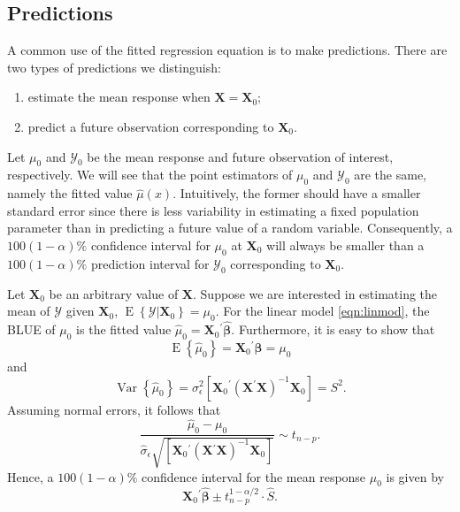 \documentclass[cmfont,usenames,dvipsnames,leqno]{afit-etd}\usepackage[]{graphicx}\usepackage[]{color}
\newcommand{\trans}{\ensuremath{^\prime}}
\newcommand{\mc}[1]{\ensuremath{\mathcal{#1}}}
\newcommand{\wh}[1]{\ensuremath{\widehat{#1}}}
\newcommand{\E}{\operatorname{E}}
\newcommand{\var}{\operatorname{Var}}
\newcommand{\X}{\ensuremath{\bm{X}}}
\begin{document}
\subsection{Predictions}
A common use of the fitted regression equation is to make predictions. There are two types of predictions we distinguish:
\begin{enumerate}[(1)]
  \item estimate the mean response when $\X = \X_0$;
  \item predict a future observation corresponding to $\X_0$.
\end{enumerate}
Let $\mu_0$ and $\mc{Y}_0$ be the mean response and future observation of interest, respectively. We will see that the point estimators of $\mu_0$ and $\mc{Y}_0$ are the same, namely the fitted value $\wh{\mu}(x)$. Intuitively, the former should have a smaller standard error since there is less variability in estimating a fixed population parameter than in predicting a future value of a random variable. Consequently, a $100(1 - \alpha)\%$ confidence interval for $\mu_0$ at $\X_0$ will always be smaller than a $100(1 - \alpha)\%$ prediction interval for $\mc{Y}_0$ corresponding to $\X_0$.

Let $\X_0$ be an arbitrary value of $\X$. Suppose we are interested in estimating the mean of $\mc{Y}$ given $\X_0$, $\E\left\{\mc{Y} | \X_0\right\} = \mu_0$. For the linear model \eqref{eqn:linmod}, the \ac{BLUE} of $\mu_0$ is the fitted value $\wh{\mu}_0 = \X_0\trans\wh{\bm{\beta}}$. Furthermore, it is easy to show that
\begin{equation*}
  \E\left\{\wh{\mu}_0\right\} = \X_0\trans\bm{\beta} = \mu_0
\end{equation*}
and
\begin{equation*}
  \var\left\{\wh{\mu}_0\right\} = \sigma_\epsilon^2\left[\X_0\trans\left(\X\trans\X \right)^{-1}\X_0\right] = S^2.
\end{equation*}
Assuming normal errors, it follows that
\begin{equation*}
  \frac{\wh{\mu}_0 - \mu_0}{\wh{\sigma}_\epsilon\sqrt{\left[ \X_0\trans \left( \X\trans\X \right)^{-1} \X_0 \right]}} \sim t_{n - p}.
\end{equation*}
Hence, a $100(1 - \alpha)\%$ confidence interval for the mean response $\mu_0$ is given by
\begin{equation}
\label{eqn:ci-response}
  \X_0\trans\wh{\bm{\beta}} \pm t_{n - p}^{1 - \alpha/2}  \cdot  \widehat{S}.
\end{equation}
\end{document}
